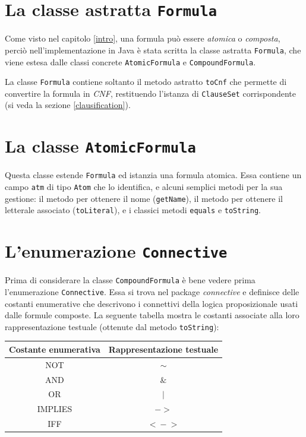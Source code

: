 \documentclass[a4paper,12pt]{report}
\begin{document}
\section{La classe astratta \texttt{Formula}}
Come visto nel capitolo \ref{intro}, una formula può essere \emph{atomica} o \emph{composta}, perciò nell'implementazione in Java è stata scritta la classe astratta \texttt{Formula}, che viene estesa dalle classi concrete \texttt{AtomicFormula} e \texttt{CompoundFormula}.

La classe \texttt{Formula} contiene soltanto il metodo astratto \texttt{toCnf} che permette di convertire la formula in \emph{CNF}, restituendo l'istanza di \texttt{ClauseSet} corrispondente (si veda la sezione \ref{clausification}).

\section{La classe \texttt{AtomicFormula}}
\label{AtomicFormula}
Questa classe estende \texttt{Formula} ed istanzia una formula atomica. Essa contiene un campo \texttt{atm} di tipo \texttt{Atom} che lo identifica, e alcuni semplici metodi per la sua gestione: il metodo per ottenere il nome (\texttt{getName}), il metodo per ottenere il letterale associato (\texttt{toLiteral}), e i classici metodi \texttt{equals} e \texttt{toString}.

\section{L'enumerazione \texttt{Connective}}
Prima di considerare la classe \texttt{CompoundFormula} è bene vedere prima l'enumerazione \texttt{Connective}. Essa si trova nel package \emph{connective} e definisce delle costanti enumerative che descrivono i connettivi della logica proposizionale usati dalle formule composte. La seguente tabella mostra le costanti associate alla loro rappresentazione testuale (ottenute dal metodo \texttt{toString}):
\begin{table}[H]
    \centering
    \begin{tabular}{|c||c|}
        \hline
        \textbf{Costante enumerativa} & \textbf{Rappresentazione testuale} \\
        \hline\hline
        NOT & $\sim$ \\
        \hline
        AND & $\&$ \\
        \hline
        OR & $|$ \\
        \hline
        IMPLIES & $-\!>$ \\
        \hline
        IFF & $<\!-\!>$ \\
        \hline
    \end{tabular}
\end{table}
\end{document}
